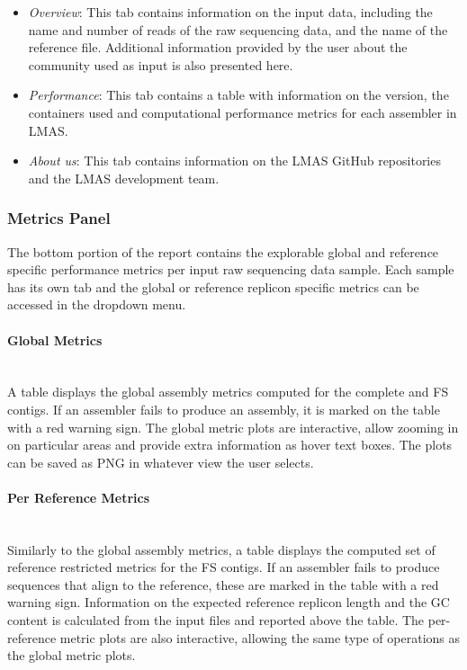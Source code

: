 \begin{itemize}
    \item \textit{Overview}: This tab contains information on the input data, including the name and number of reads of the raw sequencing data, and the name of the reference file. Additional information provided by the user about the community used as input is also presented here. 
    \item \textit{Performance}: This tab contains a table with information on the version, the containers used and computational performance metrics for each assembler in LMAS.
    \item\textit{ About us}: This tab contains information on the LMAS GitHub repositories and the LMAS development team. 
\end{itemize}

\subsubsection{Metrics Panel} \label{sssec:_chap5_summary_panel} 

The bottom portion of the report contains the explorable global and reference specific performance metrics per input raw sequencing data sample. Each sample has its own tab and the global or reference replicon specific metrics can be accessed in the dropdown menu. 


\paragraph{Global Metrics} \label{sssec:_chap5_summary_panel_global} \mbox{}\\

A table displays the global assembly metrics computed for the complete and \ac{FS} contigs. If an assembler fails to produce an assembly, it is marked on the table with a red warning sign. The global metric plots are interactive, allow zooming in on particular areas and provide extra information as hover text boxes. The plots can be saved as PNG in whatever view the user selects. 

\paragraph{Per Reference Metrics} \label{sssec:_chap5_summary_panel_reference} \mbox{}\\

Similarly to the global assembly metrics, a table displays the computed set of reference restricted metrics for the \ac{FS} contigs. If an assembler fails to produce sequences that align to the reference, these are marked in the table with a red warning sign. Information on the expected reference replicon length and the GC content is calculated from the input files and reported above the table. The per-reference metric plots are also interactive, allowing the same type of operations as the global metric plots. 


